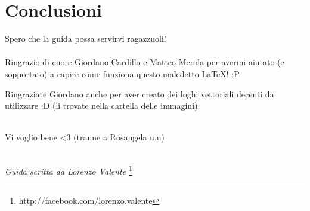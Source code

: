 
\chapter{Conclusioni}
\label{ref:Conclusioni}

Spero che la guida possa servirvi ragazzuoli!\\\\

\noindent Ringrazio di cuore Giordano Cardillo e Matteo Merola per avermi aiutato (e sopportato) a capire come funziona questo maledetto \LaTeX ! :P

Ringraziate Giordano anche per aver creato dei loghi vettoriali decenti da utilizzare :D (li trovate nella cartella delle immagini).\\\\\noindent 

\noindent Vi voglio bene <3 (tranne a Rosangela u.u)\\\\

\begin{flushright}
\textit{Guida scritta da Lorenzo Valente} \footnote{http://facebook.com/lorenzo.valente}
\end{flushright}